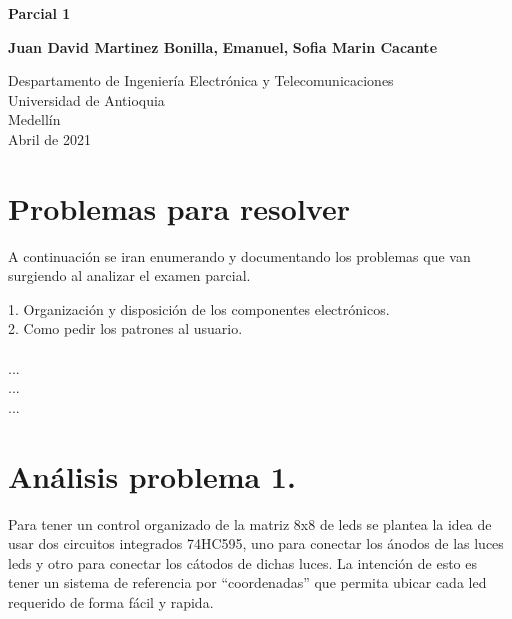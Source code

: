 \documentclass{article}
\begin{document}
\begin{titlepage}
    \begin{center}
        \vspace*{1cm}
            
        \Huge
        \textbf{Parcial 1}
            
        \vspace{0.5cm}
        \LARGE
            
        \vspace{5cm}
            
        \textbf{Juan David Martinez Bonilla,}
        \textbf{Emanuel,}
        \textbf{Sofia Marin Cacante}
            
        \vfill
            
        \vspace{0.8cm}
            
        \Large
        Despartamento de Ingeniería Electrónica y Telecomunicaciones\\
        Universidad de Antioquia\\
        Medellín\\
        Abril de 2021
            
    \end{center}
\end{titlepage}


\newpage
\section{Problemas para resolver }
A continuación se iran enumerando y documentando los problemas que van surgiendo al analizar el examen parcial.


1.	Organización y disposición de los componentes electrónicos.\\


2.	Como pedir los patrones al usuario.\\
\\
...\\
...\\
...\\

\section{Análisis problema 1.}
Para tener un control organizado de la matriz 8x8 de leds se plantea la idea de usar dos circuitos integrados 74HC595, uno para conectar los ánodos de las luces leds y otro para conectar los cátodos de dichas luces.
La intención de esto es tener un sistema de referencia por “coordenadas” que permita ubicar cada led requerido de forma fácil y rapida.
\end{document}
